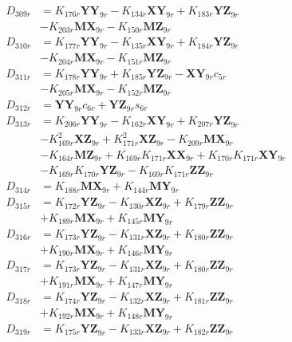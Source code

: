 \begin{multicols}{2}
\begin{align}
D_{309r} &= K_{176r}\mathbf{YY}_{9r} - K_{134r}\mathbf{XY}_{9r} + K_{183r}\mathbf{YZ}_{9r}  \nonumber \\
&- K_{203r}\mathbf{MX}_{9r} - K_{150r}\mathbf{MZ}_{9r} \nonumber \\
D_{310r} &= K_{177r}\mathbf{YY}_{9r} - K_{135r}\mathbf{XY}_{9r} + K_{184r}\mathbf{YZ}_{9r}  \nonumber \\
&- K_{204r}\mathbf{MX}_{9r} - K_{151r}\mathbf{MZ}_{9r} \nonumber \\
D_{311r} &= K_{178r}\mathbf{YY}_{9r} + K_{185r}\mathbf{YZ}_{9r} - \mathbf{XY}_{9r}c_{5r}  \nonumber \\
&- K_{205r}\mathbf{MX}_{9r} - K_{152r}\mathbf{MZ}_{9r} \nonumber \\
D_{312r} &= \mathbf{YY}_{9r}c_{6r} + \mathbf{YZ}_{9r}s_{6r} \nonumber \\
D_{313r} &= K_{206r}\mathbf{YY}_{9r} - K_{162r}\mathbf{XY}_{9r} + K_{207r}\mathbf{YZ}_{9r}  \nonumber \\
&- K_{169r}^2\mathbf{XZ}_{9r} + K_{171r}^2\mathbf{XZ}_{9r} - K_{209r}\mathbf{MX}_{9r}  \nonumber \\
&- K_{164r}\mathbf{MZ}_{9r} + K_{169r}K_{171r}\mathbf{XX}_{9r} + K_{170r}K_{171r}\mathbf{XY}_{9r}  \nonumber \\
&- K_{169r}K_{170r}\mathbf{YZ}_{9r} - K_{169r}K_{171r}\mathbf{ZZ}_{9r} \nonumber \\
D_{314r} &= K_{188r}\mathbf{MX}_{9r} + K_{144r}\mathbf{MY}_{9r} \nonumber \\
D_{315r} &= K_{172r}\mathbf{YZ}_{9r} - K_{130r}\mathbf{XZ}_{9r} + K_{179r}\mathbf{ZZ}_{9r}  \nonumber \\
&+ K_{189r}\mathbf{MX}_{9r} + K_{145r}\mathbf{MY}_{9r} \nonumber \\
D_{316r} &= K_{173r}\mathbf{YZ}_{9r} - K_{131r}\mathbf{XZ}_{9r} + K_{180r}\mathbf{ZZ}_{9r}  \nonumber \\
&+ K_{190r}\mathbf{MX}_{9r} + K_{146r}\mathbf{MY}_{9r} \nonumber \\
D_{317r} &= K_{173r}\mathbf{YZ}_{9r} - K_{131r}\mathbf{XZ}_{9r} + K_{180r}\mathbf{ZZ}_{9r}  \nonumber \\
&+ K_{191r}\mathbf{MX}_{9r} + K_{147r}\mathbf{MY}_{9r} \nonumber \\
D_{318r} &= K_{174r}\mathbf{YZ}_{9r} - K_{132r}\mathbf{XZ}_{9r} + K_{181r}\mathbf{ZZ}_{9r}  \nonumber \\
&+ K_{192r}\mathbf{MX}_{9r} + K_{148r}\mathbf{MY}_{9r} \nonumber \\
D_{319r} &= K_{175r}\mathbf{YZ}_{9r} - K_{133r}\mathbf{XZ}_{9r} + K_{182r}\mathbf{ZZ}_{9r}  \nonumber \\

\end{align}
\end{multicols}
